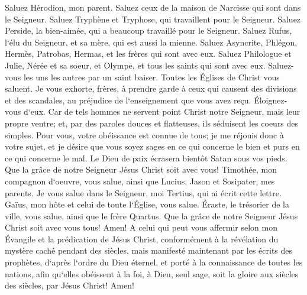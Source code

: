 \verse Saluez Hérodion, mon parent. Saluez ceux de la maison de Narcisse qui sont dans le Seigneur. 
\verse Saluez Tryphène et Tryphose, qui travaillent pour le Seigneur. Saluez Perside, la bien-aimée, qui a beaucoup travaillé pour le Seigneur. 
\verse Saluez Rufus, l`élu du Seigneur, et sa mère, qui est aussi la mienne. 
\verse Saluez Asyncrite, Phlégon, Hermès, Patrobas, Hermas, et les frères qui sont avec eux. 
\verse Saluez Philologue et Julie, Nérée et sa soeur, et Olympe, et tous les saints qui sont avec eux. 
\verse Saluez-vous les uns les autres par un saint baiser. Toutes les Églises de Christ vous saluent. 
\verse Je vous exhorte, frères, à prendre garde à ceux qui causent des divisions et des scandales, au préjudice de l`enseignement que vous avez reçu. Éloignez-vous d`eux. 
\verse Car de tels hommes ne servent point Christ notre Seigneur, mais leur propre ventre; et, par des paroles douces et flatteuses, ils séduisent les coeurs des simples. 
\verse Pour vous, votre obéissance est connue de tous; je me réjouis donc à votre sujet, et je désire que vous soyez sages en ce qui concerne le bien et purs en ce qui concerne le mal. 
\verse Le Dieu de paix écrasera bientôt Satan sous vos pieds. Que la grâce de notre Seigneur Jésus Christ soit avec vous! 
\verse Timothée, mon compagnon d`oeuvre, vous salue, ainsi que Lucius, Jason et Sosipater, mes parents. 
\verse Je vous salue dans le Seigneur, moi Tertius, qui ai écrit cette lettre. 
\verse Gaïus, mon hôte et celui de toute l`Église, vous salue. Éraste, le trésorier de la ville, vous salue, ainsi que le frère Quartus. 
\verse Que la grâce de notre Seigneur Jésus Christ soit avec vous tous! Amen! 
\verse A celui qui peut vous affermir selon mon Évangile et la prédication de Jésus Christ, conformément à la révélation du mystère caché pendant des siècles, 
\verse mais manifesté maintenant par les écrits des prophètes, d`après l`ordre du Dieu éternel, et porté à la connaissance de toutes les nations, afin qu`elles obéissent à la foi, 
\verse à Dieu, seul sage, soit la gloire aux siècles des siècles, par Jésus Christ! Amen! 

